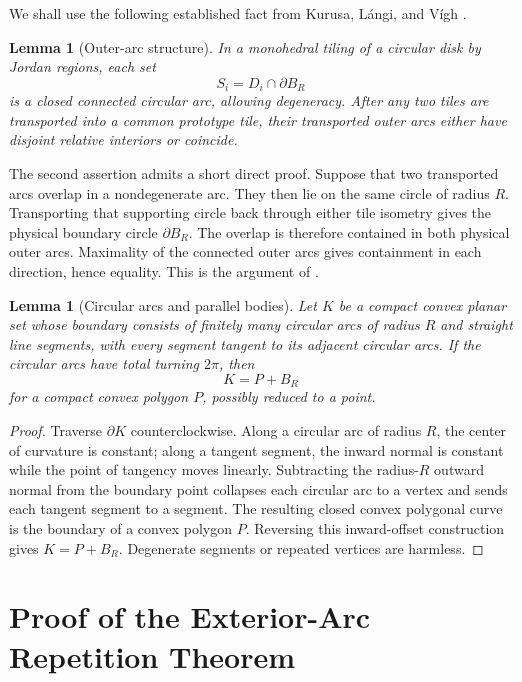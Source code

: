 \documentclass[11pt]{article}
\newtheorem{lemma}[theorem]{Lemma}
\newcommand{\BR}{B_R}
\begin{document}
We shall use the following established fact from Kurusa, L\'angi, and V\'igh \cite[Lemmas 2.6 and 2.8]{KLV2020}.

\begin{lemma}[Outer-arc structure]\label{lem:outer}
In a monohedral tiling of a circular disk by Jordan regions, each set
\[
  S_i=D_i\cap\partial\BR
\]
is a closed connected circular arc, allowing degeneracy. After any two tiles are transported into a common prototype tile, their transported outer arcs either have disjoint relative interiors or coincide.
\end{lemma}

The second assertion admits a short direct proof. Suppose that two transported arcs overlap in a nondegenerate arc. They then lie on the same circle of radius $R$. Transporting that supporting circle back through either tile isometry gives the physical boundary circle $\partial\BR$. The overlap is therefore contained in both physical outer arcs. Maximality of the connected outer arcs gives containment in each direction, hence equality. This is the argument of \cite[Remark 2.8]{KLV2020}.

\begin{lemma}[Circular arcs and parallel bodies]\label{lem:parallel}
Let $K$ be a compact convex planar set whose boundary consists of finitely many circular arcs of radius $R$ and straight line segments, with every segment tangent to its adjacent circular arcs. If the circular arcs have total turning $2\pi$, then
\[
  K=P+\BR
\]
for a compact convex polygon $P$, possibly reduced to a point.
\end{lemma}

\begin{proof}
Traverse $\partial K$ counterclockwise. Along a circular arc of radius $R$, the center of curvature is constant; along a tangent segment, the inward normal is constant while the point of tangency moves linearly. Subtracting the radius-$R$ outward normal from the boundary point collapses each circular arc to a vertex and sends each tangent segment to a segment. The resulting closed convex polygonal curve is the boundary of a convex polygon $P$. Reversing this inward-offset construction gives $K=P+\BR$. Degenerate segments or repeated vertices are harmless.
\end{proof}

\section{Proof of the Exterior-Arc Repetition Theorem}
\end{document}
